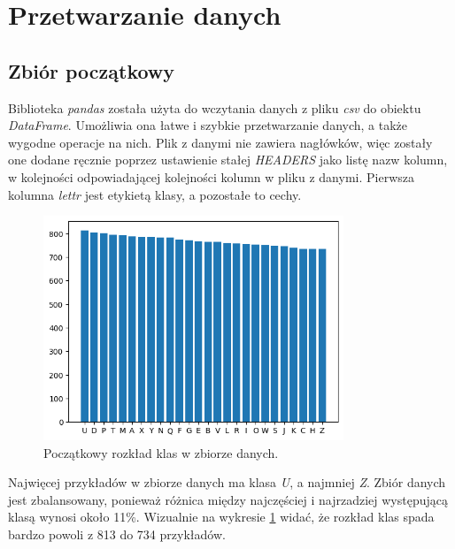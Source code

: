 \section{Przetwarzanie danych}\label{sec:przetwarzanie_danych}
\subsection{Zbiór początkowy}\label{subsec:zbior_poczatkowy}
Biblioteka \textit{pandas} \cite{mckinney-proc-scipy-2010} została użyta do wczytania danych z pliku \textit{csv} do obiektu \textit{DataFrame}.
Umożliwia ona łatwe i szybkie przetwarzanie danych, a także wygodne operacje na nich. Plik z danymi nie zawiera nagłówków, więc zostały one dodane ręcznie
poprzez ustawienie stałej \textit{HEADERS} jako listę nazw kolumn, w kolejności odpowiadającej kolejności kolumn w pliku z danymi.
Pierwsza kolumna \textit{lettr} jest etykietą klasy, a pozostałe to cechy.
\begin{figure}[H]
    \centering
    \includegraphics[width=0.8\textwidth]{img/bar_letter_count_initial.png}
    \caption{Początkowy rozkład klas w zbiorze danych.}
    \label{fig:bar_letter_count_initial}
\end{figure}
Najwięcej przykładów w zbiorze danych ma klasa \textit{U}, a najmniej \textit{Z}. 
Zbiór danych jest zbalansowany, ponieważ różnica między najczęściej i najrzadziej występującą klasą wynosi około 11\%.
Wizualnie na wykresie \ref{fig:bar_letter_count_initial} widać, że rozkład klas spada bardzo powoli z 813 do 734 przykładów.
